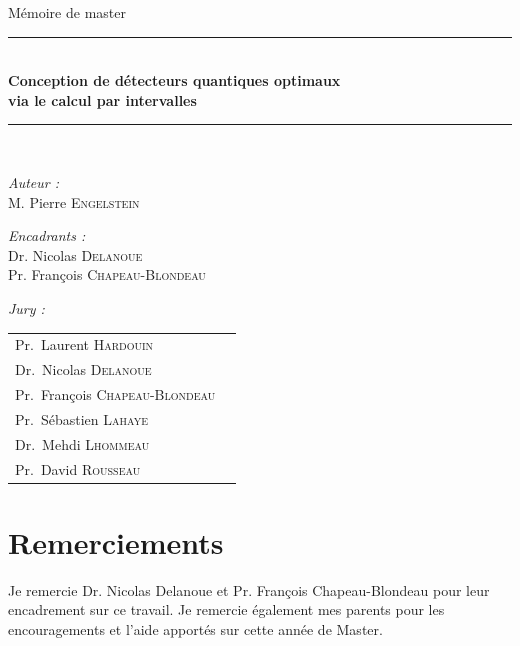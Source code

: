 \documentclass[12pt,a4paper]{report}
\newcommand\frontmatter{
    \cleardoublepage
    \pagenumbering{roman}
}
\begin{document}
\begin{titlepage}
\begin{center}
      {\large Mémoire de master}\\[0.5cm]
      \rule{\linewidth}{0.5mm} \\[0.4cm]
      { \huge \bfseries Conception de détecteurs quantiques optimaux \\ via le calcul par intervalles \\[0.4cm] }
      \rule{\linewidth}{0.5mm} \\[1.5cm]
      \noindent
      \begin{minipage}{0.4\textwidth}
        \begin{flushleft} \normalsize
          \emph{Auteur :}\\
          M. Pierre \textsc{Engelstein}\\
          \end{flushleft}
          \end{minipage}%
          \begin{minipage}{0.4\textwidth}
          \begin{flushright} \normalsize
          \emph{Encadrants :}\\
          Dr. Nicolas \textsc{Delanoue}\\
          Pr. François \textsc{Chapeau-Blondeau}\\
          \end{flushright}
      \end{minipage}
      \vfill
      \normalsize
      \emph{Jury :}
      \begin{tabular}{lc}
          Pr.~Laurent \textsc{Hardouin}\\
          Dr.~Nicolas \textsc{Delanoue}\\
          Pr.~François \textsc{Chapeau-Blondeau}\\
          Pr.~Sébastien \textsc{Lahaye}\\
          Dr.~Mehdi  \textsc{Lhommeau}\\
          Pr.~David  \textsc{Rousseau}\\
      \end{tabular}

      \vspace{2cm}

    \end{center}
\end{titlepage}

\frontmatter

\section*{Remerciements}
Je remercie Dr. Nicolas Delanoue et Pr. François Chapeau-Blondeau pour leur encadrement sur ce travail. Je remercie également mes parents pour les encouragements et l'aide apportés sur cette année de Master.
\end{document}
